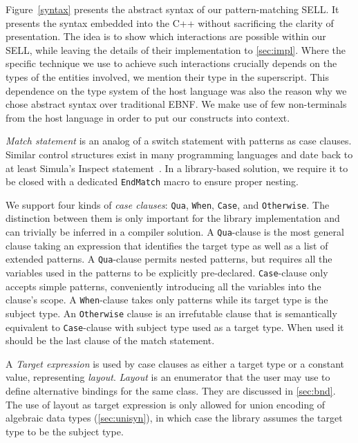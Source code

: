 \documentclass{llncs}
\makeatletter
\DeclareRobustCommand{\code}[1]{{\lstinline[keepspaces,breaklines=false,escapechar=@]{#1}}}
\makeatother
\begin{document}
Figure~\ref{syntax} presents the abstract syntax of our pattern-matching SELL. It presents 
the syntax embedded into the C++ without sacrificing 
the clarity of presentation. The idea is to show which interactions are possible 
within our SELL, while leaving the details of their implementation to 
\textsection\ref{sec:impl}. Where the specific technique we use to achieve such 
interactions crucially depends on the types of the entities involved,
we mention their type in the superscript. This dependence on the 
type system of the host language was also the reason why we chose abstract 
syntax over traditional EBNF. We make use 
of few non-terminals from the host language in order to put our constructs into 
context.

\emph{Match statement} is an analog of a switch statement with patterns as case 
clauses. Similar control structures exist in many programming languages and 
date back to at least Simula's Inspect statement~\cite{Simula67}.
In a library-based solution, we require it to be closed with a dedicated 
\code{EndMatch} macro to ensure proper nesting.

We support four kinds of \emph{case clauses}: \code{Qua}, \code{When}, 
\code{Case}, and \code{Otherwise}.
The distinction between them is only important for the library 
implementation and can trivially be inferred in a compiler solution.
A \code{Qua}-clause is the most general clause taking an  
expression that identifies the target type as well as a list of extended 
patterns.
A \code{Qua}-clause permits nested patterns, but requires all the 
variables used in the patterns to be explicitly pre-declared. \code{Case}-clause 
only accepts simple patterns, conveniently introducing all the variables into the 
clause's scope. 
A \code{When}-clause takes only patterns while its target type is 
the subject type.
An \code{Otherwise} clause is an irrefutable clause that is 
semantically equivalent to \code{Case}-clause with subject type used as a target 
type. When used it should be the last clause of the match statement.

A \emph{Target expression} is used by case clauses as either a target type or 
a constant value, representing \emph{layout}. \emph{Layout} is an enumerator 
that the user may use to define alternative bindings for the same class. They are 
discussed in \textsection\ref{sec:bnd}. The use of layout as target 
expression is only allowed for union encoding of algebraic data types 
(\textsection\ref{sec:unisyn}), in which case the library assumes the target 
type to be the subject type.
\end{document}

